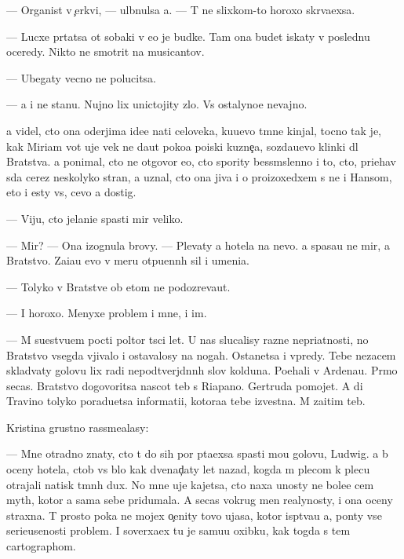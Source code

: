\documentclass[10pt]{book}
\begin{document}
— Organist v {\c}erkvi, — ul{\yi}bnulsa {\y}a. — T{\yi} ne slixkom-to horoxo skr{\yi}va{\y}exsa.

— Lucxe pr{\ia}tatsa ot sobaki v {\y}e{\y}o je budke. Tam ona budet iskaty v posledn{\io}{\y}u oceredy. Nikto ne smotrit na musicantov.

— Ubegaty vecno ne polucitsa.

— {\Y}a i ne stanu. Nujno lix unictojity zlo. Vs{\e} ostalyno{\y}e nevajno.

{\Y}a videl, cto ona oderjima ide{\y}e{\y} na{\y}ti celoveka, ku{\y}u{\x}evo t{\e}mn{\yi}{\y}e kinjal{\yi}, tocno tak je, kak Miriam vot uje vek ne da{\y}ut poko{\y}a poiski kuzne{\c}a, sozda{\y}u{\x}evo klinki dl{\ia} Bratstva. {\Y}a ponimal, cto ne otgovor{\io} {\y}e{\y}o, cto spority bessm{\yi}slenno i to, cto, pri{\y}ehav s{\io}da cerez neskolyko stran, {\y}a uznal, cto ona jiva i o proizoxedxem s ne{\y} i Hansom, eto i {\y}esty vs{\e}, cevo {\y}a dostig.

— Viju, cto jelani{\y}e spasti mir veliko.

— Mir? — Ona izognula brovy. — Plevaty {\y}a hotela na nevo. {\Y}a spasa{\y}u ne mir, a Bratstvo. Za{\x}i{\x}a{\y}u {\y}evo v meru otpu{\x}enn{\yi}h sil i umeni{\y}a.

— Tolyko v Bratstve ob etom ne podozreva{\y}ut.

— I horoxo. Menyxe problem i mne, i im.

— M{\yi} su{\x}estvu{\y}em pocti poltor{\yi} t{\yi}s{\ia}ci let. U nas slucalisy razn{\yi}{\y}e nepri{\y}atnosti, no Bratstvo vsegda v{\yi}jivalo i ostavalosy na nogah. Ostanetsa i vpredy. Tebe nezacem sklad{\yi}vaty golovu lix radi nepodtverjd{\e}nn{\yi}h slov kolduna. Po{\y}ehali v Ardenau. Pr{\ia}mo se{\y}cas. Bratstvo dogovoritsa nascot teb{\ia} s Riapano. Gertruda pomojet. A di Travino tolyko poradu{\y}etsa informati{\y}i, kotora{\y}a tebe izvestna. M{\yi} za{\x}itim teb{\ia}.

Kristina grustno rassme{\y}alasy:

— Mne otradno znaty, cto t{\yi} do sih por p{\yi}ta{\y}exsa spasti mo{\y}u golovu, Ludwig. {\Y}a b{\yi} oceny hotela, ctob{\yi} vs{\e} b{\yi}lo kak dvenad{\c}aty let nazad, kogda m{\yi} plecom k plecu otrajali natisk t{\e}mn{\yi}h dux. No mne uje kajetsa, cto naxa {\y}unosty ne bole{\y}e cem myth, kotor{\yi}{\y} {\y}a sama sebe pridumala. A se{\y}cas vokrug men{\ia} realynosty, i ona oceny straxna. T{\yi} prosto poka ne mojex o{\c}enity tovo ujasa, kotor{\yi}{\y} isp{\yi}t{\yi}va{\y}u {\y}a, pon{\ia}ty vse{\y} serieusenosti problem{\yi}. I soverxa{\y}ex tu je samu{\y}u oxibku, kak togda s tem cartographom.
\end{document}
